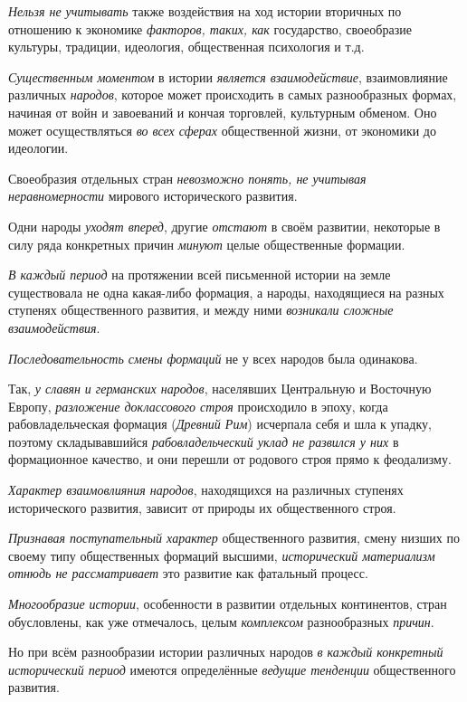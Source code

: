\documentclass[a4paper,14pt,russian]{extreport}
\begin{document}
\emph{Нельзя не учитывать} также воздействия на ход истории вторичных по отношению к экономике \emph{факторов, таких, как} государство, своеобразие культуры, традиции, идеология, общественная психология и т.д.

\emph{Существенным моментом} в истории \emph{является взаимодействие}, взаимовлияние различных \emph{народов}, которое может происходить в самых разнообразных формах, начиная от войн и завоеваний и кончая торговлей, культурным обменом. Оно может осуществляться \emph{во всех сферах} общественной жизни, от экономики до идеологии.

Своеобразия отдельных стран \emph{невозможно понять, не учитывая неравномерности} мирового исторического развития.

Одни народы \emph{уходят вперед}, другие \emph{отстают} в своём развитии, некоторые в силу ряда конкретных причин \emph{минуют} целые общественные формации.

\emph{В каждый период} на протяжении всей письменной истории на земле существовала не одна какая-либо формация, а народы, находящиеся на разных ступенях общественного развития, и между ними \emph{возникали сложные взаимодействия}.

\emph{Последовательность смены формаций} не у всех народов была одинакова.

Так, \emph{у славян и германских народов}, населявших Центральную и Восточную Европу, \emph{разложение доклассового строя} происходило в эпоху, когда рабовладельческая формация (\emph{Древний Рим}) исчерпала себя и шла к упадку, поэтому складывавшийся \emph{рабовладельческий уклад не развился у них} в формационное качество, и они перешли от родового строя прямо к феодализму.

\emph{Характер взаимовлияния народов}, находящихся на различных ступенях исторического развития, зависит от природы их общественного строя.

\emph{Признавая поступательный характер} общественного развития, смену низших по своему типу общественных формаций высшими, \emph{исторический материализм отнюдь не рассматривает} это развитие как фатальный процесс.

\emph{Многообразие истории}, особенности в развитии отдельных континентов, стран обусловлены, как уже отмечалось, целым \emph{комплексом} разнообразных \emph{причин}.

Но при всём разнообразии истории различных народов \emph{в каждый конкретный исторический период} имеются определённые \emph{ведущие тенденции} общественного развития.
\end{document}
